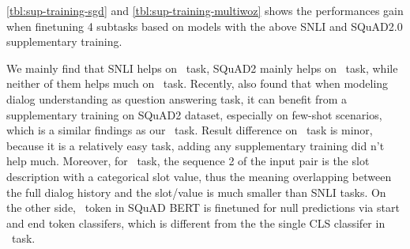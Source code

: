 \autoref{tbl:sup-training-sgd} and \autoref{tbl:sup-training-multiwoz}
shows the performances gain when finetuning 4 subtasks based on models
with the above SNLI and SQuAD2.0 supplementary training.

We mainly find that SNLI helps on \IC~task, SQuAD2 mainly helps on
\NSL~task, while neither of them helps much on \CSL~task. Recently,
\citet{namazifar2020language} also found that when modeling dialog
understanding as question answering task, it can benefit from a
supplementary training on SQuAD2 dataset, especially on few-shot
scenarios, which is a similar findings as our \NSL~task. Result
difference on \RSI~task is minor, because it is a relatively easy
task, adding any supplementary training did n't help much. Moreover,
for \CSL~task, the sequence 2 of the input pair is the slot
description with a categorical slot value, thus the meaning overlapping between the
full dialog history and the slot/value is much smaller than SNLI
tasks. On the other side, \CLS~token in SQuAD BERT is finetuned for
null predictions via start and end token classifers, which is
different from the the single CLS classifer in \CSL~task.

